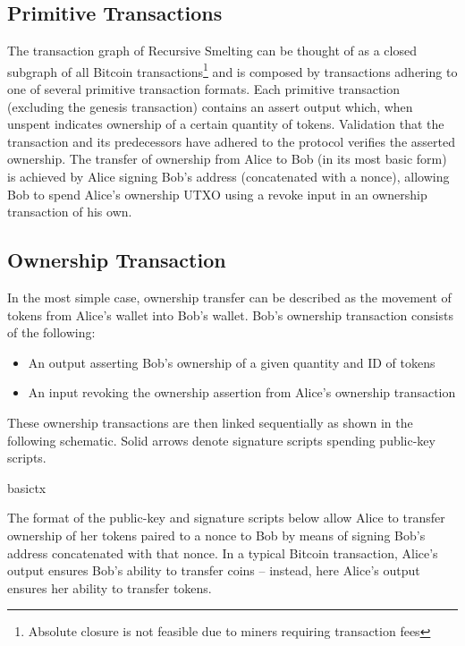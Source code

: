 \documentclass[9pt,oneside]{amsart}
\begin{document}
\begin{multicols}{2}
\section{Primitive Transactions}\label{sec:primtrans}
The transaction graph of Recursive Smelting can be thought of as a closed subgraph of all Bitcoin transactions\footnote{Absolute closure is not feasible due to miners requiring transaction fees} and is composed by transactions adhering to one of several primitive transaction formats. Each primitive transaction (excluding the genesis transaction) contains an assert output which, when unspent indicates ownership of a certain quantity of tokens.  Validation that the transaction and its predecessors have adhered to the protocol verifies the asserted ownership. The transfer of ownership from Alice to Bob (in its most basic form) is achieved by Alice signing Bob's address (concatenated with a nonce), allowing Bob to spend Alice's ownership UTXO using a revoke input in an ownership transaction of his own.

\subsection{Ownership Transaction}\label{subsec:basicownershiptx}
In the most simple case, ownership transfer can be described as the movement of tokens from Alice's wallet into Bob's wallet. Bob's ownership transaction consists of the following:
\begin{itemize}
    \item An output asserting Bob's ownership of a given quantity and ID of tokens
    \item An input revoking the ownership assertion from Alice's ownership transaction
\end{itemize}

These ownership transactions are then linked sequentially as shown in the following schematic. Solid arrows denote signature scripts spending public-key scripts.
\begin{center}
{basictx}
\end{center}

The format of the public-key and signature scripts below allow Alice to transfer ownership of her tokens paired to a nonce to Bob by means of signing Bob's address concatenated with that nonce. In a typical Bitcoin transaction, Alice's output ensures Bob's ability to transfer coins -- instead, here Alice's output ensures her ability to transfer tokens.


\end{multicols}
\end{document}
